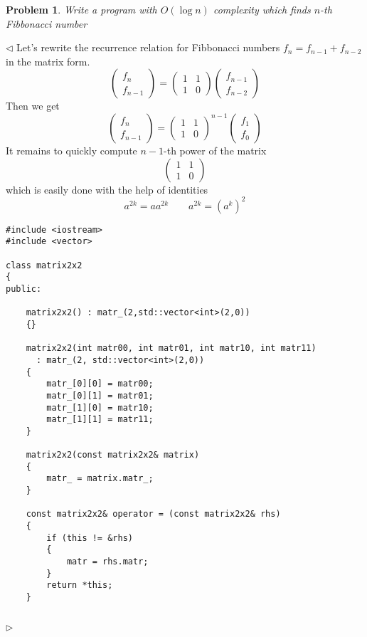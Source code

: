 \documentclass[12pt]{article}
\newtheorem{problem}{Problem}[subsection]
\newenvironment{solution}{\par $\triangleleft$}{$\triangleright$}
\begin{document}
 
\begin{problem} Write a program with $O(\log n)$ complexity which finds $n$-th Fibbonacci number
\end{problem}
\begin{solution} Let's rewrite the recurrence relation for Fibbonacci numbers $f_n=f_{n-1}+f_{n-2}$ in the matrix form.
$$
\begin{pmatrix} f_n\\ f_{n-1}\end{pmatrix}=\begin{pmatrix} 1 & 1\\ 1 & 0\end{pmatrix} \begin{pmatrix} f_{n-1}\\ f_{n-2} \end{pmatrix}
$$
Then we get
$$
\begin{pmatrix} f_n\\ f_{n-1}\end{pmatrix}=\begin{pmatrix} 1 & 1\\ 1 & 0\end{pmatrix}^{n-1} \begin{pmatrix} f_1\\ f_0 \end{pmatrix}
$$
It remains to quickly compute $n-1$-th power of the matrix 
$$
\begin{pmatrix} 1 & 1\\ 1 & 0\end{pmatrix}
$$
which is easily done with the help of identities
$$
a^{2k}=a a^{2k}\qquad a^{2k}=(a^k)^2
$$
\begin{verbatim}
#include <iostream>
#include <vector>
 
class matrix2x2
{
public:
    
    matrix2x2() : matr_(2,std::vector<int>(2,0))
    {}
    
    matrix2x2(int matr00, int matr01, int matr10, int matr11) 
      : matr_(2, std::vector<int>(2,0))
    {
        matr_[0][0] = matr00;
        matr_[0][1] = matr01;
        matr_[1][0] = matr10;
        matr_[1][1] = matr11;
    }
    
    matrix2x2(const matrix2x2& matrix)
    {
        matr_ = matrix.matr_;
    }
    
    const matrix2x2& operator = (const matrix2x2& rhs)
    {
        if (this != &rhs)
        {
            matr = rhs.matr;
        }
        return *this;
    }
    

\end{verbatim}
\end{solution}
\end{document}
